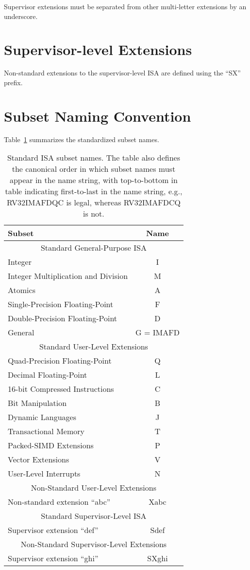 Supervisor extensions must be separated from other multi-letter extensions
by an underscore.

\section{Supervisor-level Extensions}
Non-standard extensions to the supervisor-level ISA are defined using
the ``SX'' prefix.

\section{Subset Naming Convention}
Table~\ref{isanametable} summarizes the standardized subset names.
~\\
\begin{table}[h]
\center
\begin{tabular}{|l|c|}
\hline
Subset & Name \\
\hline
\hline
\multicolumn{2}{|c|}{Standard General-Purpose ISA}\\
\hline
Integer & I \\
Integer Multiplication and Division & M \\
Atomics & A \\
Single-Precision Floating-Point & F \\
Double-Precision Floating-Point & D \\
\hline
General & G = IMAFD \\
\hline
\multicolumn{2}{|c|}{Standard User-Level Extensions}\\
\hline
Quad-Precision Floating-Point & Q \\
Decimal Floating-Point & L \\
16-bit Compressed Instructions & C \\
Bit Manipulation & B \\
Dynamic Languages & J \\
Transactional Memory & T \\
Packed-SIMD Extensions & P \\
Vector Extensions & V \\
User-Level Interrupts & N \\
\hline
\hline
\multicolumn{2}{|c|}{Non-Standard User-Level Extensions}\\
\hline
Non-standard extension ``abc'' & Xabc \\
\hline
\hline
\multicolumn{2}{|c|}{Standard Supervisor-Level ISA}\\
\hline
Supervisor extension ``def'' & Sdef \\
\hline
\hline
\multicolumn{2}{|c|}{Non-Standard Supervisor-Level Extensions}\\
\hline
Supervisor extension ``ghi'' & SXghi \\
\hline
\end{tabular}
\caption{Standard ISA subset names.  The table also defines the
  canonical order in which subset names must appear in the name
  string, with top-to-bottom in table indicating first-to-last in the
  name string, e.g., RV32IMAFDQC is legal, whereas RV32IMAFDCQ is not.}
\label{isanametable}
\end{table}


